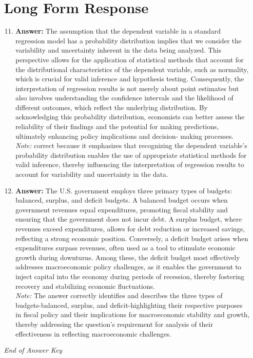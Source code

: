\documentclass[12pt]{article}
\begin{document}
\section*{Long Form Response}
\begin{enumerate}[label=\arabic*.]
\setcounter{enumi}{10}
\item \textbf{Answer:} The assumption that the dependent variable in a standard regression model has a probability distribution implies that we consider the variability and uncertainty inherent in the data being analyzed. This perspective allows for the application of statistical methods that account for the distributional characteristics of the dependent variable, such as normality, which is crucial for valid inference and hypothesis testing. Consequently, the interpretation of regression results is not merely about point estimates but also involves understanding the confidence intervals and the likelihood of different outcomes, which reflect the underlying distribution. By acknowledging this probability distribution, economists can better assess the reliability of their findings and the potential for making predictions, ultimately enhancing policy implications and decision- making processes.
\\ \textit{Note:} correct because it emphasizes that recognizing the dependent variable's probability distribution enables the use of appropriate statistical methods for valid inference, thereby influencing the interpretation of regression results to account for variability and uncertainty in the data.
\item \textbf{Answer:} The U.S. government employs three primary types of budgets: balanced, surplus, and deficit budgets. A balanced budget occurs when government revenues equal expenditures, promoting fiscal stability and ensuring that the government does not incur debt. A surplus budget, where revenues exceed expenditures, allows for debt reduction or increased savings, reflecting a strong economic position. Conversely, a deficit budget arises when expenditures surpass revenues, often used as a tool to stimulate economic growth during downturns. Among these, the deficit budget most effectively addresses macroeconomic policy challenges, as it enables the government to inject capital into the economy during periods of recession, thereby fostering recovery and stabilizing economic fluctuations.
\\ \textit{Note:} The answer correctly identifies and describes the three types of budgets-balanced, surplus, and deficit-highlighting their respective purposes in fiscal policy and their implications for macroeconomic stability and growth, thereby addressing the question's requirement for analysis of their effectiveness in reflecting macroeconomic challenges.
\end{enumerate}

\vfill
\noindent\textit{End of Answer Key}
\end{document}
